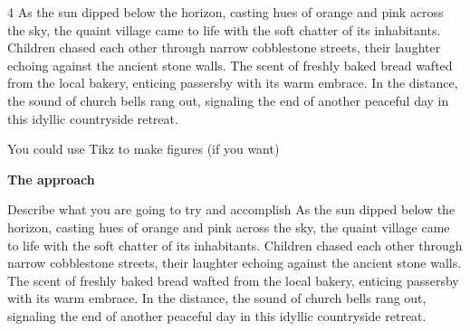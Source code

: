 \documentclass[a0]{4by3}
\newcommand{\NumColumns}{4}
\begin{document}
\begin{minipage}{\linewidth + 2\fboxsep}
\begin{multicols*}{\NumColumns}
As the sun dipped below the horizon, casting hues of orange and pink across the sky, the quaint village came to life with the soft chatter of its inhabitants. Children chased each other through narrow cobblestone streets, their laughter echoing against the ancient stone walls. The scent of freshly baked bread wafted from the local bakery, enticing passersby with its warm embrace. In the distance, the sound of church bells rang out, signaling the end of another peaceful day in this idyllic countryside retreat.



            \columnbreak
            You could use Tikz to make figures (if you want)
            
            \begin{center}
                \vspace{5mm}
                \vspace{5mm}
            \end{center}
        
        \begin{center}
        \LARGE{\textbf{The approach}}
        \end{center}
            \large
        
            Describe what you are going to try and accomplish
	As the sun dipped below the horizon, casting hues of orange and pink across the sky, the quaint village came to life with the soft chatter of its inhabitants. Children chased each other through narrow cobblestone streets, their laughter echoing against the ancient stone walls. The scent of freshly baked bread wafted from the local bakery, enticing passersby with its warm embrace. In the distance, the sound of church bells rang out, signaling the end of another peaceful day in this idyllic countryside retreat.



\end{multicols*}
\end{minipage}
\end{document}
